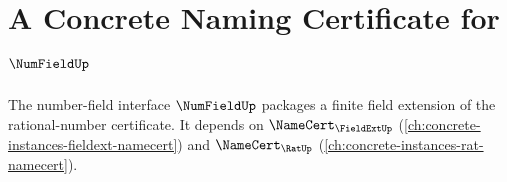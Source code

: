 \chapter{A Concrete Naming Certificate for $\NumFieldUp$}
\label{ch:concrete-instances-numfield-namecert}

The number-field interface $\NumFieldUp$ packages a finite field extension of the rational-number certificate. It depends on $\NameCert_{\FieldExtUp}$ (\autoref{ch:concrete-instances-fieldext-namecert}) and $\NameCert_{\RatUp}$ (\autoref{ch:concrete-instances-rat-namecert}).





